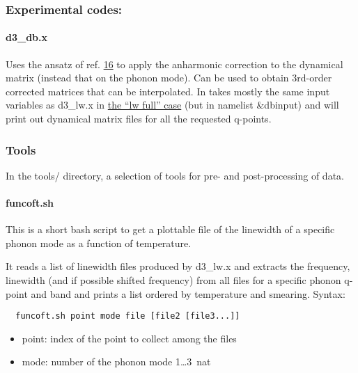 \documentclass[
]{article}
\providecommand{\tightlist}{%
  \setlength{\itemsep}{0pt}\setlength{\parskip}{0pt}}
\begin{document}
\hypertarget{experimental-codes}{%
\subsubsection{Experimental codes:}\label{experimental-codes}}

\hypertarget{d3_db.x}{%
\paragraph{d3\_db.x}\label{d3_db.x}}

Uses the ansatz of ref. \protect\hyperlink{ref16}{16} to apply the
anharmonic correction to the dynamical matrix (instead that on the
phonon mode). Can be used to obtain 3rd-order corrected matrices that
can be interpolated. In takes mostly the same input variables as
d3\_lw.x in \protect\hyperlink{calculation-character-default-lw}{the
\enquote{lw full} case} (but in namelist \&dbinput) and will print out
dynamical matrix files for all the requested q-points.

\hypertarget{tools}{%
\subsubsection{Tools}\label{tools}}

In the tools/ directory, a selection of tools for pre- and
post-processing of data.

\hypertarget{funcoft.sh}{%
\paragraph{funcoft.sh}\label{funcoft.sh}}

This is a short bash script to get a plottable file of the linewidth of
a specific phonon mode as a function of temperature.

It reads a list of linewidth files produced by d3\_lw.x and extracts the
frequency, linewidth (and if possible shifted frequency) from all files
for a specific phonon q-point and band and prints a list ordered by
temperature and smearing. Syntax:

\begin{verbatim}
  funcoft.sh point mode file [file2 [file3...]]
\end{verbatim}

\begin{itemize}
\tightlist
\item
  point: index of the point to collect among the files
\item
  mode: number of the phonon mode 1\ldots3~nat
\end{itemize}
\end{document}
